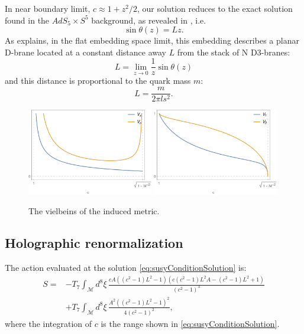 In near boundary limit, $c \approx 1 + z^2/2$, our solution reduces to the exact solution found in the $AdS_5 \times S^5$ background, as revealed in \cite{Karch:2005ms}, i.e.
\begin{equation}
 \sin\theta(z) = L z.
\end{equation}
As \cite{Karch:2005ms} explains, in the flat embedding space limit, this embedding describes a planar D-brane located at a constant distance away $L$ from the stack of N D3-branes:
\begin{equation}
 L = \lim_{z \rightarrow 0 } \frac{1}{z} \sin\theta(z)
\end{equation}
and this distance is proportional to the quark mass $m$:
\begin{equation}
 L = \dfrac{m}{2 \pi ls^2}.
\end{equation}

\begin{figure}[t]
\begin{center}
\includegraphics[width=0.49\textwidth]{pictures/vxvc.png}
\includegraphics[width=0.49\textwidth]{pictures/v1v2.png}
\end{center}
\caption{\label{fig:vielbeins} The vielbeins of the induced metric. }
\end{figure}



\subsection{Holographic renormalization}

The action evaluated at the solution \eqref{eq:susyConditionSolution} is:
\begin{align}\label{eq:ActionAtSolution}
 S = & -T_7 \int_\mathcal{M} d^8\xi \, 
 \frac{c A \left(\left(c^2-1\right) L^2-1\right) \left(c \left(c^2-1\right) L^2 A-\left(c^2-1\right) L^2+1\right)}{\left(c^2-1\right)^3}
 \nonumber \\
     & +T_7\int _\mathcal{M} d^8\xi \, 
 \frac{A^2 \left(\left(c^2-1\right) L^2-1\right)^2}{4 \left(c^2-1\right)^2},
\end{align}
where the integration of $c$ is the range shown in \eqref{eq:susyConditionSolution}.

